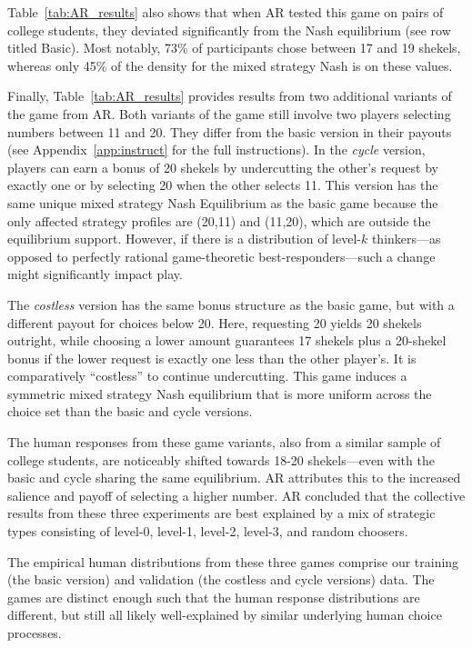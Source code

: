 Table~\ref{tab:AR_results} also shows that when AR tested this game on pairs of college students, they deviated significantly from the Nash equilibrium (see row titled Basic).
Most notably, 73\% of participants chose between 17 and 19 shekels, whereas only 45\% of the density for the mixed strategy Nash is on these values.

Finally, Table~\ref{tab:AR_results} provides results from two additional variants of the game from AR.
Both variants of the game still involve two players selecting numbers between 11 and 20.
They differ from the basic version in their payouts (see Appendix~\ref{app:instruct} for the full instructions).
In the \emph{cycle} version, players can earn a bonus of 20 shekels by undercutting the other's request by exactly one or by selecting 20 when the other selects 11. 
This version has the same unique mixed strategy Nash Equilibrium as the basic game because the only affected strategy profiles are (20,11) and (11,20), which are outside the equilibrium support.
However, if there is a distribution of level-$k$ thinkers---as opposed to perfectly rational game-theoretic best-responders---such a change might significantly impact play.

The \emph{costless} version has the same bonus structure as the basic game, but with a different payout for choices below 20.
Here, requesting 20 yields 20 shekels outright, while choosing a lower amount guarantees 17 shekels plus a 20-shekel bonus if the lower request is exactly one less than the other player's. 
It is comparatively ``costless'' to continue undercutting.
This game induces a symmetric mixed strategy Nash equilibrium that is more uniform across the choice set than the basic and cycle versions.

The human responses from these game variants, also from a similar sample of college students, are noticeably shifted towards 18-20 shekels---even with the basic and cycle sharing the same equilibrium.
AR attributes this to the increased salience and payoff of selecting a higher number.
AR concluded that the collective results from these three experiments are best explained by a mix of strategic types consisting of level-0, level-1, level-2, level-3, and random choosers.

The empirical human distributions from these three games comprise our training (the basic version) and validation (the costless and cycle versions) data.
The games are distinct enough such that the human response distributions are different, but still all likely well-explained by similar underlying human choice processes.
